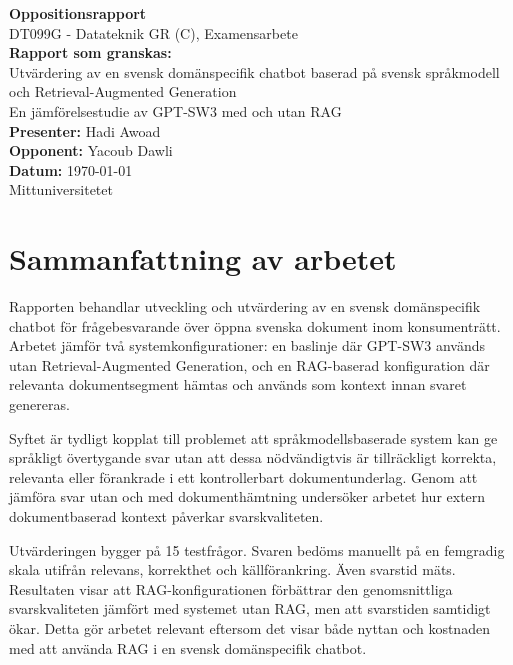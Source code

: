 \documentclass[12pt,a4paper]{article}
\begin{document}

\begin{titlepage}
\centering
\vspace*{3cm}

{\Large \textbf{Oppositionsrapport}}\\[0.5cm]
{\large DT099G - Datateknik GR (C), Examensarbete}\\[1.5cm]

{\large \textbf{Rapport som granskas:}}\\[0.2cm]
{\large Utvärdering av en svensk domänspecifik chatbot baserad på svensk språkmodell och Retrieval-Augmented Generation}\\[0.2cm]
{\large En jämförelsestudie av GPT-SW3 med och utan RAG}\\[1.0cm]

{\large \textbf{Presenter:} Hadi Awoad}\\[0.4cm]
{\large \textbf{Opponent:} Yacoub Dawli}\\[0.4cms]
{\large \textbf{Datum:} \today}\\[3cm]

\vfill
{\large Mittuniversitetet}\\

\end{titlepage}


\section{Sammanfattning av arbetet}

Rapporten behandlar utveckling och utvärdering av en svensk domänspecifik chatbot för frågebesvarande över öppna svenska dokument inom konsumenträtt. Arbetet jämför två systemkonfigurationer: en baslinje där GPT-SW3 används utan Retrieval-Augmented Generation, och en RAG-baserad konfiguration där relevanta dokumentsegment hämtas och används som kontext innan svaret genereras.

Syftet är tydligt kopplat till problemet att språkmodellsbaserade system kan ge språkligt övertygande svar utan att dessa nödvändigtvis är tillräckligt korrekta, relevanta eller förankrade i ett kontrollerbart dokumentunderlag. Genom att jämföra svar utan och med dokumenthämtning undersöker arbetet hur extern dokumentbaserad kontext påverkar svarskvaliteten.

Utvärderingen bygger på 15 testfrågor. Svaren bedöms manuellt på en femgradig skala utifrån relevans, korrekthet och källförankring. Även svarstid mäts. Resultaten visar att RAG-konfigurationen förbättrar den genomsnittliga svarskvaliteten jämfört med systemet utan RAG, men att svarstiden samtidigt ökar. Detta gör arbetet relevant eftersom det visar både nyttan och kostnaden med att använda RAG i en svensk domänspecifik chatbot.
\end{document}
